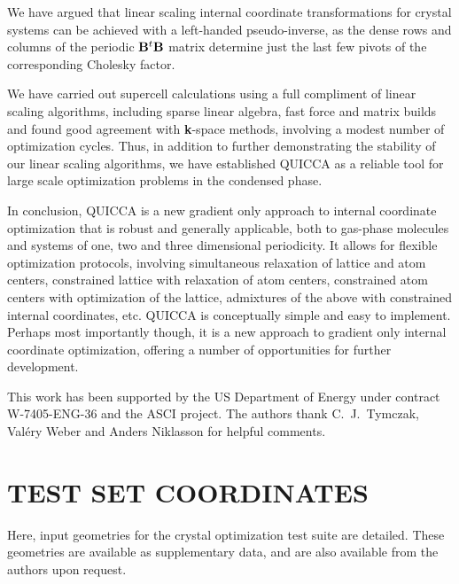 \twolinestyle{\documentclass[prb,preprint]{revtex4}}
\begin{document}
We have argued that linear scaling internal coordinate transformations for 
crystal systems can be achieved with a left-handed pseudo-inverse, as the 
dense rows and columns of the periodic ${\bf B}^t {\bf B}$ matrix determine
just the last few pivots of the corresponding Cholesky factor.

We have carried out supercell calculations using a full compliment of
linear scaling algorithms, including sparse linear algebra, fast force and 
matrix builds and found good agreement with {\bf k}-space methods, involving 
a modest number of optimization cycles.  Thus, in addition to further demonstrating 
the stability of our linear scaling algorithms, we have established QUICCA as a 
reliable tool for large scale optimization problems in the condensed phase.

In conclusion, QUICCA is a new gradient only approach to internal coordinate
optimization that is robust and generally applicable, both to gas-phase
molecules and systems of one, two and three dimensional periodicity.  It 
allows for flexible optimization protocols, involving simultaneous 
relaxation of lattice and atom centers, constrained lattice with relaxation of 
atom centers, constrained atom centers with optimization of the lattice,
admixtures of the above with constrained internal coordinates, etc. 
QUICCA is conceptually simple and easy to implement.
Perhaps most importantly though, it is a new approach to gradient only 
internal coordinate optimization, offering a number of opportunities for 
further development.

\begin{acknowledgments}
 This work has been supported by the US Department of Energy 
 under contract W-7405-ENG-36 and the ASCI project.  The authors
 thank C.~J.~Tymczak, Val\'ery Weber and Anders Niklasson for helpful 
 comments.
\end{acknowledgments}


%

\appendix

\section{TEST SET COORDINATES}\label{Geometries}

Here, input geometries for the crystal optimization test suite are detailed.  These
geometries are available as supplementary data, and are also available from the
authors upon request.
\end{document}
